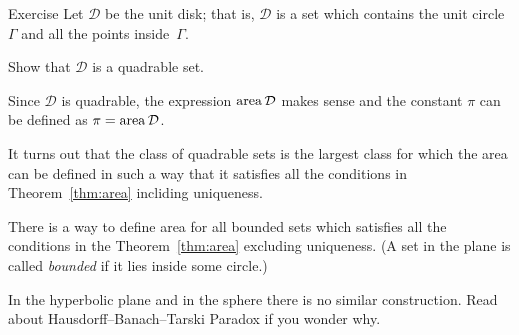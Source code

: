 \begin{thm}{Exercise}\label{ex:circle-is-quadrable}
Let $\mathcal{D}$ be the unit disk;
that is, $\mathcal{D}$ is a set which contains 
the unit circle $\Gamma$ and all the points inside~$\Gamma$.

Show that $\mathcal{D}$ is a quadrable set.
\end{thm}

Since $\mathcal{D}$ is quadrable, the expression $\mathop{\rm area}\nolimits\mathcal{D}$ makes sense and the constant $\pi$ can be defined as $\pi=\mathop{\rm area}\nolimits\mathcal{D}$.

\medskip

It turns out that the class of quadrable sets is the largest class for which 
the area can be defined in such a way that it satisfies all the conditions in Theorem~\ref{thm:area} incliding uniqueness.

There is a way to define area for all bounded sets
which satisfies all the conditions in the Theorem~\ref{thm:area} excluding uniqueness.
(A set in the plane is called \emph{bounded} if it lies inside some circle.)

In the hyperbolic plane and in the sphere
there is no similar construction.
Read about Hausdorff--Banach--Tarski Paradox
if you wonder why.


